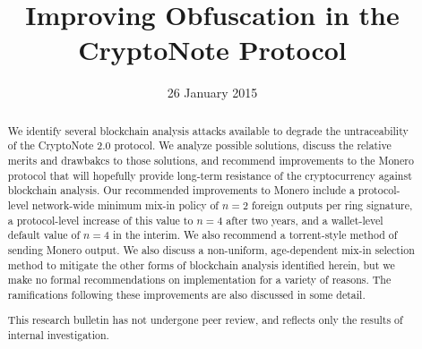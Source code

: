 \documentclass[12pt,english]{mrl}
\theoremstyle{definition}
\numberwithin{equation}{section}
\numberwithin{figure}{section}
\numberwithin{equation}{section}
\numberwithin{equation}{section}
\numberwithin{figure}{section}
\begin{document}
\begin{frontmatter}

\begin{fmbox}
\hfill\setlength{\fboxrule}{0px}\setlength{\fboxsep}{5px}
\title{Improving Obfuscation in the CryptoNote Protocol}
\date{26 January 2015}
\author[
   addressref={mrl},
   email={lab@getmonero.org}
]{ }
\author[
   addressref={mrl},
   email={lab@getmonero.org}
]{ }
\author[
   addressref={mrl},
   email={lab@getmonero.org}
]{}


\address[id=mrl]{
}
\end{fmbox}


\begin{abstractbox}
\begin{abstract}
We identify several blockchain analysis attacks available to degrade the untraceability of the CryptoNote 2.0 protocol. We analyze possible solutions, discuss the relative merits and drawbakcs to those solutions, and recommend improvements to the Monero protocol that will hopefully provide long-term resistance of the cryptocurrency against blockchain analysis. Our recommended improvements to Monero include a protocol-level network-wide minimum mix-in policy of $n=2$ foreign outputs per ring signature, a protocol-level increase of this value to $n=4$ after two years, and a wallet-level default value of $n=4$ in the interim. We also recommend a torrent-style method of sending Monero output. We also discuss a non-uniform, age-dependent mix-in selection method to mitigate the other forms of blockchain analysis identified herein, but we make no formal recommendations on implementation for a variety of reasons.  The ramifications following these improvements are also discussed in some detail.

This research bulletin has not undergone peer review, and reflects only the results of internal investigation.
\end{abstract}
\end{abstractbox}

\end{frontmatter}

\end{document}
